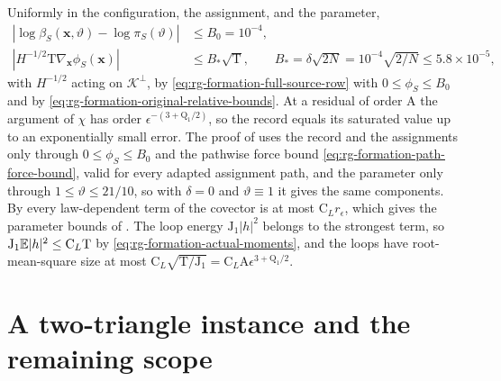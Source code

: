 Uniformly in the configuration, the assignment, and the parameter,
\begin{equation}
\begin{aligned}
|\log\beta_S(\mathbf x,\vartheta)-\log\pi_S(\vartheta)|&\le B_0=10^{-4},\\
|H^{-1/2}\mathrm T\nabla_{\mathbf x}\phi_S(\mathbf x)|&\le B_*\sqrt{\mathrm T},
\qquad
B_*=\delta\sqrt{2N}=10^{-4}\sqrt{2/N}\le5.8\times10^{-5},
\end{aligned}
\label{eq:rg-formation-source-saturation}
\end{equation}
with \(H^{-1/2}\) acting on \(\mathcal K^\perp\), by
\cref{eq:rg-formation-full-source-row} with \(0\le\phi_S\le B_0\) and by
\cref{eq:rg-formation-original-relative-bounds}. At a residual of order
\(\mathrm A\) the argument of \(\chi\) has order
\(\epsilon^{-(3+\mathrm Q_1/2)}\), so the record equals its saturated value up
to an exponentially small error. The proof of 
uses the record and the assignments only through \(0\le\phi_S\le B_0\) and the
pathwise force bound \cref{eq:rg-formation-path-force-bound}, valid for every
adapted assignment path, and the parameter only through
\(1\le\vartheta\le21/10\), so with \(\delta=0\) and \(\vartheta\equiv1\) it
gives the same components. By
every law-dependent term of the covector is at most \(\mathrm C_Lr_\epsilon\),
which gives the parameter bounds of .
The loop energy \(\mathrm J_1|h|^2\) belongs to the strongest term, so
\(\mathrm J_1\mathbb E|h|^2\le\mathrm C_L\mathrm T\) by
\cref{eq:rg-formation-actual-moments}, and the loops have root-mean-square size
at most \(\mathrm C_L\sqrt{\mathrm T/\mathrm J_1}
=\mathrm C_L\mathrm A\epsilon^{3+\mathrm Q_1/2}\). 

\section{A two-triangle instance and the remaining scope}
\label{sec:rg-formation-example-scope}

